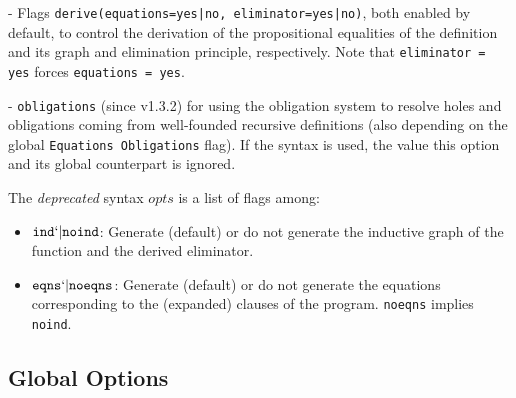 - Flags \texttt{derive(equations=yes|no, eliminator=yes|no)}, both enabled by default,
  to control the derivation of the propositional equalities of the definition and its 
  graph and elimination principle, respectively. Note that \texttt{eliminator = yes} 
  forces \texttt{equations = yes}.

- \texttt{obligations} (since v1.3.2) for using the obligation system to resolve
  holes and obligations coming from well-founded recursive definitions (also
  depending on the global \texttt{Equations Obligations} flag). If the
   syntax is used, the value this option and its global counterpart is ignored.

The \emph{deprecated} syntax $opts$ is a list of flags among:

\begin{itemize}
\item $\texttt{ind} `| \texttt{noind}$: Generate (default) or do not generate 
  the inductive graph of the function and the derived eliminator.
\item $\texttt{eqns} `| \texttt{noeqns}$: Generate (default) or do not generate 
  the equations corresponding to the (expanded) clauses of the program.
  \texttt{noeqns} implies \texttt{noind}.
\end{itemize}

\subsection{Global Options}


